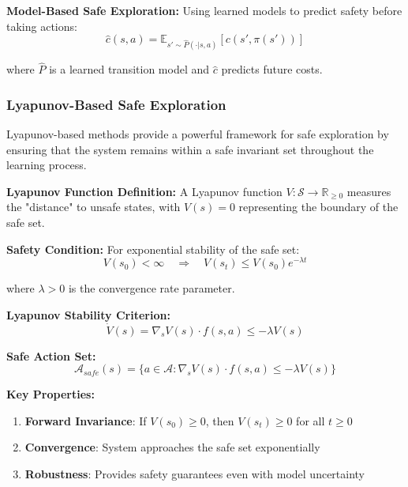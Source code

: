 \documentclass[12pt]{article}
\begin{document}
{{{{\textbf{Model-Based Safe Exploration:}
Using learned models to predict safety before taking actions:
\begin{equation}
\hat{c}(s,a) = \mathbb{E}_{s' \sim \hat{P}(\cdot|s,a)}[c(s', \pi(s'))]
\end{equation}

where $\hat{P}$ is a learned transition model and $\hat{c}$ predicts future costs.

\subsubsection{Lyapunov-Based Safe Exploration}

Lyapunov-based methods provide a powerful framework for safe exploration by ensuring that the system remains within a safe invariant set throughout the learning process.

\textbf{Lyapunov Function Definition:}
A Lyapunov function $V: \mathcal{S} \rightarrow \mathbb{R}_{\geq 0}$ measures the "distance" to unsafe states, with $V(s) = 0$ representing the boundary of the safe set.

\textbf{Safety Condition:}
For exponential stability of the safe set:
\begin{equation}
V(s_0) < \infty \quad \Rightarrow \quad V(s_t) \leq V(s_0) e^{-\lambda t}
\end{equation}

where $\lambda > 0$ is the convergence rate parameter.

\textbf{Lyapunov Stability Criterion:}
\begin{equation}
\dot{V}(s) = \nabla_s V(s) \cdot f(s,a) \leq -\lambda V(s)
\end{equation}

\textbf{Safe Action Set:}
\begin{equation}
\mathcal{A}_{safe}(s) = \{a \in \mathcal{A} : \nabla_s V(s) \cdot f(s,a) \leq -\lambda V(s)\}
\end{equation}

\textbf{Key Properties:}
\begin{enumerate}
\item \textbf{Forward Invariance}: If $V(s_0) \geq 0$, then $V(s_t) \geq 0$ for all $t \geq 0$
\item \textbf{Convergence}: System approaches the safe set exponentially
\item \textbf{Robustness}: Provides safety guarantees even with model uncertainty
\end{enumerate}

}}}}
\end{document}
